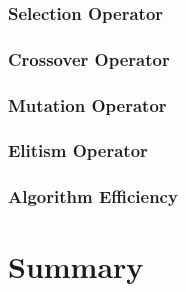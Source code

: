 \subsubsection{Selection Operator}
\subsubsection{Crossover Operator}
\subsubsection{Mutation Operator}
\subsubsection{Elitism Operator}
\subsubsection{Algorithm Efficiency}
\section {Summary}
